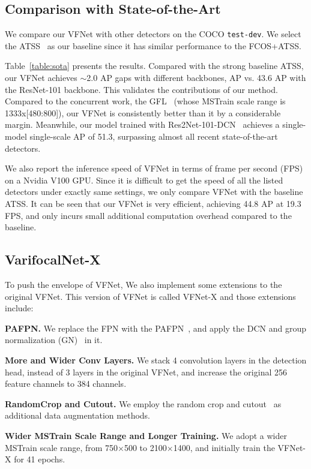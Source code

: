 \subsection{Comparison with State-of-the-Art}
We compare our VFNet with other detectors on the COCO \texttt{test-dev}. We select the ATSS~\cite{ATSS} as our baseline since it has similar performance to the FCOS+ATSS.

Table~\ref{table:sota} presents the results. Compared with the strong baseline ATSS, our VFNet achieves $\sim$2.0 AP gaps with different backbones,  AP vs. 43.6 AP with the ResNet-101 backbone. This validates the contributions of our method. Compared to the concurrent work, the GFL~\cite{GFL} (whose MSTrain scale range is 1333x[480:800]), our VFNet is consistently better than it by a considerable margin. Meanwhile, our model trained with Res2Net-101-DCN~\cite{Res2Net} achieves a single-model single-scale AP of 51.3, surpassing almost all recent state-of-the-art detectors.

We also report the inference speed of VFNet in terms of frame per second (FPS) on a Nvidia V100 GPU. Since it is difficult to get the speed of all the listed detectors under exactly same settings, we only compare VFNet with the baseline ATSS. 
It can be seen that our VFNet is very efficient, \eg achieving 44.8 AP at 19.3 FPS, and only incurs small additional computation overhead compared to the baseline.


\vspace{-0.5mm}
\subsection{VarifocalNet-X}
To push the envelope of VFNet, We also implement some extensions to the original VFNet. This version of VFNet is called VFNet-X and those extensions include: 

\noindent \textbf{PAFPN.} We replace the FPN with the PAFPN~\cite{PAFPN}, and apply the DCN and group normalization (GN)~\cite{GN} in it.

\noindent \textbf{More and Wider Conv Layers.} We stack 4 convolution layers in the detection head, instead of 3 layers in the original VFNet, and increase the original 256 feature channels to 384 channels. 

\noindent \textbf{RandomCrop and Cutout.} We employ the random crop and cutout~\cite{cutout} as additional data augmentation methods.

\noindent \textbf{Wider MSTrain Scale Range and Longer Training.} We adopt a wider MSTrain scale range, from 750$\times$500 to 2100$\times$1400, and initially train the VFNet-X for 41 epochs.


